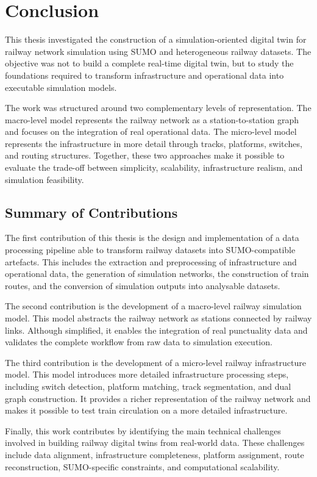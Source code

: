 \chapter{Conclusion}\label{chap:conclusion}
This thesis investigated the construction of a simulation-oriented digital twin for railway network simulation using SUMO 
and heterogeneous railway datasets. The objective was not to build a complete real-time digital twin, but to study the 
foundations required to transform infrastructure and operational data into executable simulation models.

The work was structured around two complementary levels of representation. The macro-level model represents the railway 
network as a station-to-station graph and focuses on the integration of real operational data. The micro-level model 
represents the infrastructure in more detail through tracks, platforms, switches, and routing structures. Together, these 
two approaches make it possible to evaluate the trade-off between simplicity, scalability, infrastructure realism, and 
simulation feasibility.

\section{Summary of Contributions}
The first contribution of this thesis is the design and implementation of a data processing pipeline able to transform 
railway datasets into SUMO-compatible artefacts. This includes the extraction and preprocessing of infrastructure and 
operational data, the generation of simulation networks, the construction of train routes, and the conversion of simulation 
outputs into analysable datasets.

The second contribution is the development of a macro-level railway simulation model. This model abstracts the railway 
network as stations connected by railway links. Although simplified, it enables the integration of real punctuality data 
and validates the complete workflow from raw data to simulation execution.

The third contribution is the development of a micro-level railway infrastructure model. This model introduces more 
detailed infrastructure processing steps, including switch detection, platform matching, track segmentation, and dual graph 
construction. It provides a richer representation of the railway network and makes it possible to test train circulation 
on a more detailed infrastructure.

Finally, this work contributes by identifying the main technical challenges involved in building railway digital twins from 
real-world data. These challenges include data alignment, infrastructure completeness, platform assignment, route 
reconstruction, SUMO-specific constraints, and computational scalability.

